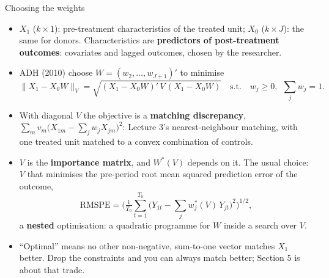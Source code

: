 \documentclass[
  11pt,
  ignorenonframetext,
  aspectratio=169,
]{beamer}
\providecommand{\tightlist}{%
  \setlength{\itemsep}{0pt}\setlength{\parskip}{0pt}}
\begin{document}
\begin{frame}{Choosing the weights}
\protect{}\label{choosing-the-weights}
\begin{itemize}
\tightlist
\item
  \(X_1\) (\(k \times 1\)): pre-treatment characteristics of the treated
  unit; \(X_0\) (\(k \times J\)): the same for donors. Characteristics
  are \textbf{predictors of post-treatment outcomes}: covariates and
  lagged outcomes, chosen by the researcher.
\item
  ADH (2010) choose \(W = (w_2, \dots, w_{J+1})'\) to minimise \[
  \|X_1 - X_0 W\|_V = \sqrt{(X_1 - X_0 W)'\, V\, (X_1 - X_0 W)}
  \quad\text{s.t.}\quad w_j \geq 0,\ \ \textstyle\sum_j w_j = 1 .
  \]
\item
  With diagonal \(V\) the objective is a \textbf{matching discrepancy},
  \(\sum_m v_m \big(X_{1m} - \sum_j w_j X_{jm}\big)^2\): Lecture 3's
  nearest-neighbour matching, with one treated unit matched to a convex
  combination of controls.
\item
  \(V\) is the \textbf{importance matrix}, and \(W^{*}(V)\) depends on
  it. The usual choice: \(V\) that minimises the pre-period root mean
  squared prediction error of the outcome, \[
  \text{RMSPE} = \Big( \tfrac{1}{T_0} \textstyle\sum_{t=1}^{T_0} \big( Y_{1t} - \sum_j w_j^{*}(V)\, Y_{jt} \big)^2 \Big)^{1/2},
  \] a \textbf{nested} optimisation: a quadratic programme for \(W\)
  inside a search over \(V\).
\item
  ``Optimal'' means no other non-negative, sum-to-one vector matches
  \(X_1\) better. Drop the constraints and you can always match better;
  Section 5 is about that trade.
\end{itemize}
\end{frame}
\end{document}
